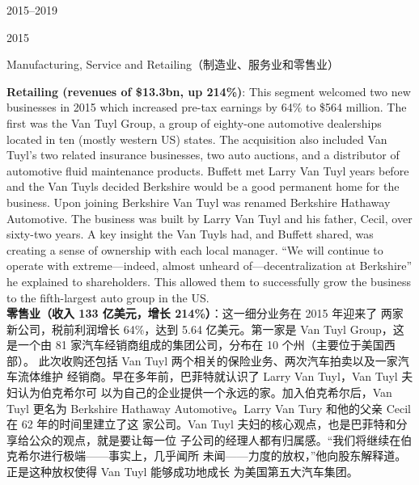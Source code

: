 \begin{chapter}{2015--2019}
\begin{section}{2015}
\begin{subsection}{Manufacturing, Service and Retailing（制造业、服务业和零售业）}
\begin{verseparallel}
{    \textbf{Retailing (revenues of \$13.3bn, up 214\%)}: This segment welcomed
    two new businesses in 2015 which increased pre-tax earnings by 64\% to \$564
    million. The first was the Van Tuyl Group, a group of eighty-one automotive
    dealerships located in ten (mostly western US) states. The acquisition also
    included Van Tuyl's two related insurance businesses, two auto auctions,
    and a distributor of automotive fluid maintenance products. Buffett met
    Larry Van Tuyl years before and the Van Tuyls decided Berkshire would be a
    good permanent home for the business. Upon joining Berkshire Van Tuyl was
    renamed Berkshire Hathaway Automotive. The business was built by Larry Van
    Tuyl and his father, Cecil, over sixty-two years. A key insight the Van
    Tuyls had, and Buffett shared, was creating a sense of ownership with each
    local manager. ``We will continue to operate with extreme—indeed, almost
    unheard of—decentralization at Berkshire'' he explained to shareholders.
    This allowed them to successfully grow the business to the fifth-largest
    auto group in the US\@.  \\

  }
  {
    \textbf{零售业（收入 133 亿美元，增长 214\%）}：这一细分业务在 2015 年迎来了
    两家新公司，税前利润增长 64\%，达到 5.64 亿美元。第一家是 Van Tuyl Group，这
    是一个由 81 家汽车经销商组成的集团公司，分布在 10 个州（主要位于美国西部）。
    此次收购还包括 Van Tuyl 两个相关的保险业务、两次汽车拍卖以及一家汽车流体维护
    经销商。早在多年前，巴菲特就认识了 Larry Van Tuyl，Van Tuyl 夫妇认为伯克希尔可
    以为自己的企业提供一个永远的家。加入伯克希尔后，Van Tuyl 更名为 Berkshire
    Hathaway Automotive。Larry Van Tury 和他的父亲 Cecil 在 62 年的时间里建立了这
    家公司。Van Tuyl 夫妇的核心观点，也是巴菲特和分享给公众的观点，就是要让每一位
    子公司的经理人都有归属感。“我们将继续在伯克希尔进行极端——事实上，几乎闻所
    未闻——力度的放权，”他向股东解释道。正是这种放权使得 Van Tuyl 能够成功地成长
    为美国第五大汽车集团。
  }
\end{verseparallel}


\end{subsection}
\end{section}
\end{chapter}
